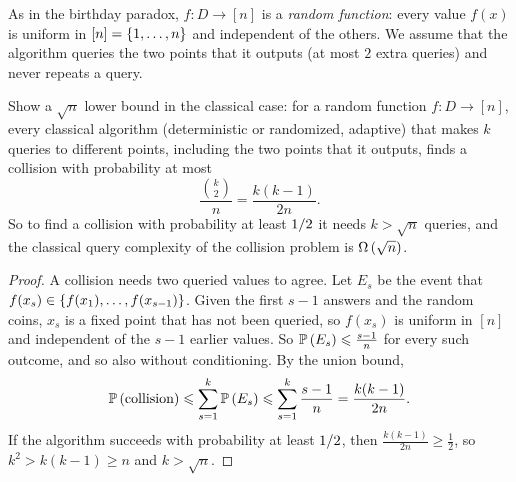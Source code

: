 As in the birthday paradox, $f \colon D \to [n]$ is a \emph{random function}: every value $f(x)$ is
uniform in $[n] = \left\lbrace1, \dots, n\right\rbrace$ and independent of the others. We assume that the algorithm
queries the two points that it outputs (at most $2$ extra queries) and never repeats a query.

\begin{exercisebox}
\begin{exercise}\label{ex:collision-lb-0903}\label{thm:collision-lb-0903}
    Show a $\sqrt{n}$ lower bound in the classical case: for a random function
    $f \colon D \to [n]$, every classical algorithm (deterministic or randomized, adaptive) that
    makes $k$ queries to different points, including the two points that it outputs, finds a
    collision with probability at most
    \[\frac{\binom{k}{2}}{n} = \frac{k(k-1)}{2n}.\]
    So to find a collision with probability at least $1/2$ it needs $k > \sqrt{n}$
    queries, and the classical query complexity of the collision problem is $\Omega\left(\sqrt{n}\right)$.
\end{exercise}
\tcblower
\begin{proof}
    A collision needs two queried values to agree. Let $E_s$ be the event that
    $f(x_s) \in \left\lbrace f(x_1), \dots, f(x_{s-1})\right\rbrace$. Given the first $s-1$ answers and the random
    coins, $x_s$ is a fixed point that has not been queried, so $f(x_s)$ is uniform in $[n]$ and
    independent of the $s-1$ earlier values. So $\prob{E_s} \leq \frac{s-1}{n}$ for every such
    outcome, and so also without conditioning. By the union bound,
    \[\prob{\text{collision}} \leq \sum_{s=1}^{k} \prob{E_s} \leq \sum_{s=1}^{k} \frac{s-1}{n} = \frac{k(k-1)}{2n}.\]
    If the algorithm succeeds with probability at least $1/2$, then
    $\frac{k(k-1)}{2n} \geq \frac{1}{2}$, so $k^2 > k(k-1) \geq n$ and $k > \sqrt{n}$.
\end{proof}
\end{exercisebox}
